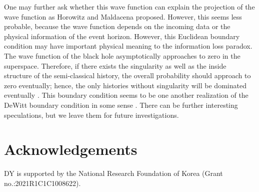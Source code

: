 \documentclass{andromedaone}
\begin{document}
One may further ask whether this wave function can explain the projection of the wave function as Horowitz and Maldacena proposed. However, this seems less probable, because the wave function depends on the incoming data or the physical information of the event horizon. However, this Euclidean boundary condition may have important physical meaning to the information loss paradox. The wave function of the black hole asymptotically approaches to zero in the superspace. Therefore, if there exists the singularity as well as the inside structure of the semi-classical history, the overall probability should approach to zero eventually; hence, the only histories without singularity will be dominated eventually \cite{Sasaki:2014spa}. This boundary condition seems to be one another realization of the DeWitt boundary condition in some sense \cite{Bouhmadi-Lopez:2019kkt}. There can be further interesting speculations, but we leave them for future investigations.






\section*{Acknowledgements}
DY is supported by the National Research Foundation of Korea (Grant no.:2021R1C1C1008622).
\end{document}
